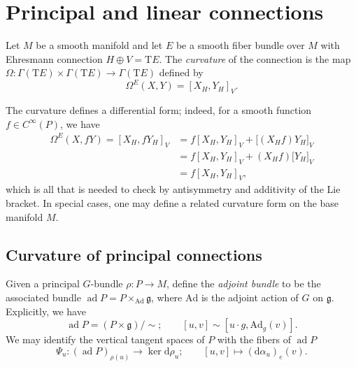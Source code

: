 \section{Principal and linear connections}

\begin{definition}
  Let $M$ be a smooth manifold and let $E$ be a smooth fiber bundle over $M$ with Ehresmann connection $H \oplus V = \mathrm{T}E$. The \emph{curvature} of the connection is the map $\Omega \colon \Gamma(\mathrm{T}E) \times \Gamma(\mathrm{T}E) \to \Gamma(\mathrm{T}E)$ defined by 
  \begin{equation}
    \Omega^E(X, Y) = [X_H, Y_H]_V.
  \end{equation}
\end{definition}

The curvature defines a differential form; indeed, for a smooth function $f \in C^\infty(P)$, we have
\begin{align}
  \Omega^E(X, fY) = [X_H, fY_H]_V
  &= f[X_H, Y_H]_V + \big[(X_H f) Y_H\big]_V \\
  &= f[X_H, Y_H]_V + (X_H f) \big[Y_H\big]_V \\
  &= f[X_H, Y_H]_V,
\end{align}
which is all that is needed to check by antisymmetry and additivity of the Lie bracket. In special cases, one may define a related curvature form on the base manifold $M$.

\subsection{Curvature of principal connections}
Given a principal $G$-bundle $\rho \colon P \to M$, define the \emph{adjoint bundle} to be the associated bundle $\operatorname{ad} P = P \times_{\mathrm{Ad}} \mathfrak{g}$, where $\mathrm{Ad}$ is the adjoint action of $G$ on $\mathfrak{g}$. Explicitly, we have
\begin{equation}
  \operatorname{ad} P = (P \times \mathfrak{g}) / {\sim}; \quad \quad [u, v] \sim [u \cdot g, \mathrm{Ad}_g(v)].
\end{equation}
We may identify the vertical tangent spaces of $P$ with the fibers of $\operatorname{ad} P$ 
\begin{equation}
  \Psi_{u} \colon (\operatorname{ad} P)_{\rho(u)} \to \ker \mathrm{d}\rho_u; \quad \quad [u, v] \longmapsto (\mathrm{d}\alpha_{u})_e(v).
\end{equation}


